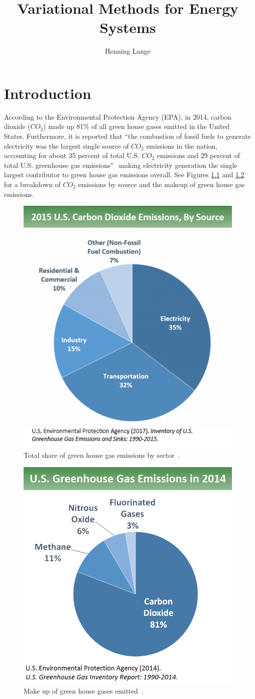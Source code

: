 \documentclass[11pt]{cmuthesis} %
\title{Variational Methods for Energy Systems}
\author{Henning Lange}
\begin{document}





\chapter{Introduction}

According to the Environmental Protection Agency (EPA), in 2014, carbon dioxide ($CO_2$) made up 81\% of all green house gases emitted in the United States. Furthermore, it is reported that ``the combustion of fossil fuels to generate electricity was the largest single source of $CO_2$ emissions in the nation, accounting for about 35 percent of total U.S. $CO_2$ emissions and 29 percent of total U.S. greenhouse gas emissions"~\cite{EPA} making electricity generation the single largest contributor to green house gas emissions overall. See Figures \ref{fig:intro} and \ref{fig:intro2} for a breakdown of $CO_2$ emissions by source and the makeup of green house gas emissions.
\begin{figure}
\centering
\includegraphics[width=0.45\linewidth]{co2b.png}
\caption[Total share of green house gas emissions by sector.]{Total share of green house gas emissions by sector~\cite{EPA}.}
\label{fig:intro}
\end{figure}

\begin{figure}
    \centering
    \includegraphics[width=0.50\linewidth]{ghgs.png}
    \caption[Make up of green house gases emitted]{Make up of green house gases emitted~\cite{EPA}.}
    \label{fig:intro2}
\end{figure}
\end{document}
